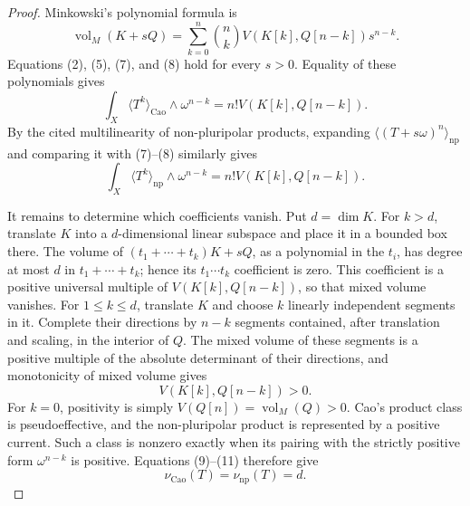 \begin{proof}
Minkowski's polynomial formula is
\[
 \operatorname{vol}_M(K+sQ)
 =\sum_{k=0}^n\binom nk
       V(K[k],Q[n-k])s^{n-k}.
\tag{8}
\]
Equations (2), (5), (7), and (8) hold for every \(s>0\).  Equality of these
polynomials gives
\[
 \int_X\langle T^k\rangle_{\mathrm{Cao}}\wedge\omega^{n-k}
       =n!V(K[k],Q[n-k]).
\tag{9}
\]
By the cited multilinearity of non-pluripolar products, expanding
\(\langle(T+s\omega)^n\rangle_{\mathrm{np}}\) and comparing it with
(7)--(8) similarly gives
\[
 \int_X\langle T^k\rangle_{\mathrm{np}}\wedge\omega^{n-k}
       =n!V(K[k],Q[n-k]).
\tag{10}
\]

It remains to determine which coefficients vanish.  Put \(d=\dim K\).
For \(k>d\), translate \(K\) into a \(d\)-dimensional linear subspace and
place it in a bounded box there.  The volume of
\((t_1+\cdots+t_k)K+sQ\), as a polynomial in the \(t_i\), has degree at most
\(d\) in \(t_1+\cdots+t_k\); hence its \(t_1\cdots t_k\) coefficient is zero.
This coefficient is a positive universal multiple of
\(V(K[k],Q[n-k])\), so that mixed volume vanishes.  For \(1\leq k\leq d\),
translate \(K\) and choose \(k\) linearly independent segments in it.
Complete their directions by \(n-k\) segments contained, after translation
and scaling, in the interior of \(Q\).  The mixed volume of these segments
is a positive multiple of the absolute determinant of their directions, and
monotonicity of mixed volume gives
\[
 V(K[k],Q[n-k])>0.
\tag{11}
\]
For \(k=0\), positivity is simply \(V(Q[n])=\operatorname{vol}_M(Q)>0\).
Cao's product class is pseudoeffective, and the non-pluripolar product is
represented by a positive current.  Such a class is nonzero exactly when
its pairing with the strictly positive form \(\omega^{n-k}\) is positive.
Equations (9)--(11) therefore give
\[
                    \nu_{\mathrm{Cao}}(T)
                    =\nu_{\mathrm{np}}(T)
                    =d.
\]
\end{proof}
